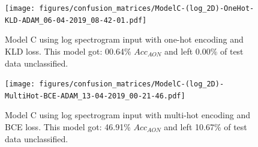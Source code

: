 \begin{appendices}
            \begin{figure}[H]
                \centering
                \texttt{[image: figures/confusion\_matrices/ModelC-(log\_2D)-OneHot-KLD-ADAM\_06-04-2019\_08-42-01.pdf]}
                \caption*{Model C using log spectrogram input with one-hot encoding and KLD loss. This model got: 00.64\% $Acc_{AON}$ and left 0.00\% of test data unclassified.}
            \end{figure}
            
            \begin{figure}[H]
                \centering
                \texttt{[image: figures/confusion\_matrices/ModelC-(log\_2D)-MultiHot-BCE-ADAM\_13-04-2019\_00-21-46.pdf]}
                \caption*{Model C using log spectrogram input with multi-hot encoding and BCE loss. This model got: 46.91\% $Acc_{AON}$ and left 10.67\% of test data unclassified.}
            \end{figure}
    
\end{appendices}
